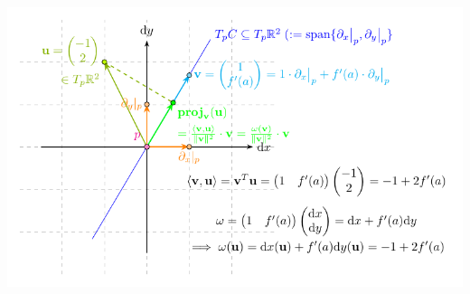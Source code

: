 \documentclass[11pt,openany]{article}
\renewcommand{\vec}[1]{\mathbf{#1}}
\begin{document}
%
%
%
%
%
%
%
%
%
%
%

\begin{center}
	\includegraphics[scale=1.2]{tangent-space-7.pdf}
\end{center}
\end{document}
